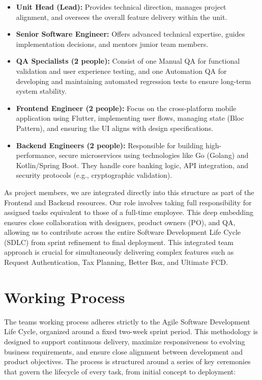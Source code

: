 \documentclass[12pt,oneside,openright,a4paper]{cpe-english-project}
\begin{document}
\begin{itemize}
\item
  \textbf{Unit Head (Lead):} Provides technical direction, manages
  project alignment, and oversees the overall feature delivery within
  the unit.
\item
  \textbf{Senior Software Engineer:} Offers advanced technical
  expertise, guides implementation decisions, and mentors junior team
  members.
\item
  \textbf{QA Specialists (2 people):} Consist of one Manual QA for
  functional validation and user experience testing, and one Automation
  QA for developing and maintaining automated regression tests to ensure
  long-term system stability.
\item
  \textbf{Frontend Engineer (2 people):} Focus on the cross-platform
  mobile application using Flutter, implementing user flows, managing
  state (Bloc Pattern), and ensuring the UI aligns with design
  specifications.
\item
  \textbf{Backend Engineers (2 people):} Responsible for building
  high-performance, secure microservices using technologies like Go
  (Golang) and Kotlin/Spring Boot. They handle core banking logic, API
  integration, and security protocols (e.g., cryptographic validation).
\end{itemize}

As project members, we are integrated directly into this structure as
part of the Frontend and Backend resources. Our role involves taking
full responsibility for assigned tasks equivalent to those of a
full-time employee. This deep embedding ensures close collaboration with
designers, product owners (PO), and QA, allowing us to contribute across
the entire Software Development Life Cycle (SDLC) from sprint refinement
to final deployment. This integrated team approach is crucial for
simultaneously delivering complex features such as Request
Authentication, Tax Planning, Better Box, and Ultimate FCD.

\section{Working Process}

The team\textquotesingle s working process adheres strictly to the Agile
Software Development Life Cycle, organized around a fixed two-week
sprint period. This methodology is designed to support continuous
delivery, maximize responsiveness to evolving business requirements, and
ensure close alignment between development and product objectives. The
process is structured around a series of key ceremonies that govern the
lifecycle of every task, from initial concept to deployment:
\end{document}
